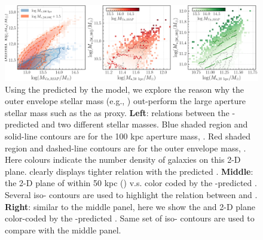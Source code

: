 \documentclass[fleqn,usenatbib,useAMS,english]{mnras}
\begin{document}
  \begin{figure}
      \centering
      \includegraphics[width=\textwidth]{figure/topn_fig_12}
      \caption{
          Using the \mvir{} predicted by the \asap{} model, we explore the reason why the outer
          envelope stellar mass (e.g., ) out-perform the large aperture stellar mass
          such as the  as \mvir{} proxy.
          \textbf{Left}: relations between the \asap{}-predicted \mvir{} and two different stellar
          masses. Blue shaded region and solid-line contours are for the 100 kpc aperture mass, 
          . Red shaded region and dashed-line contours are for the outer envelope
          mass, . Here colours indicate the number density of galaxies on this 2-D plane.
          \menve{} clearly displays tighter relation with the predicted \mvir{}.
          \textbf{Middle}: the 2-D plane of \mstar{} within 50 kpc () v.s.
           color coded by the \asap{}-predicted \mvir{}.
          Several iso-\mvir{} contours are used to highlight the relation between \mvir{} and
          .
          \textbf{Right}: similar to the middle panel, here we show the \minn{} and 
          2-D plane color-coded by the \asap{}-predicted \mvir{}.
          Same set of iso-\mvir{} contours are used to compare with the middle panel.
      }
      \label{fig:outskirt_discussion}
  \end{figure}

\end{document}

